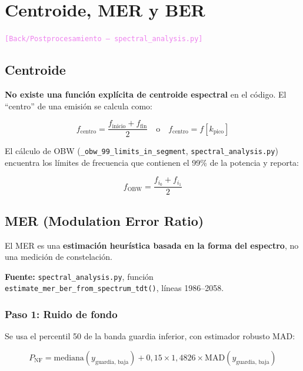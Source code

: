 \documentclass[11pt,a4paper]{article}
\newcommand{\where}[1]{\textcolor{violet}{\texttt{[#1]}}}
\begin{document}
\section{Centroide, MER y BER}
\label{sec:mer_ber}

\where{Back/Postprocesamiento — \texttt{spectral\_analysis.py}}

\subsection{Centroide}

\textbf{No existe una función explícita de centroide espectral} en el código. El ``centro'' de una emisión se calcula como:

\begin{equation}
f_{\text{centro}} = \frac{f_{\text{inicio}} + f_{\text{fin}}}{2} \quad \text{o} \quad f_{\text{centro}} = f[k_{\text{pico}}]
\label{eq:center}
\end{equation}

El cálculo de OBW (\texttt{\_obw\_99\_limits\_in\_segment}, \texttt{spectral\_analysis.py}) encuentra los límites de frecuencia que contienen el 99\% de la potencia y reporta:

\begin{equation}
f_{\text{OBW}} = \frac{f_{i_0} + f_{i_1}}{2}
\label{eq:obw_center}
\end{equation}

\subsection{MER (Modulation Error Ratio)}

El MER es una \textbf{estimación heurística basada en la forma del espectro}, no una medición de constelación.

\textbf{Fuente:} \texttt{spectral\_analysis.py}, función \texttt{estimate\_mer\_ber\_from\_spectrum\_tdt()}, líneas 1986--2058.

\subsubsection{Paso 1: Ruido de fondo}

Se usa el percentil 50 de la banda guardia inferior, con estimador robusto MAD:

\begin{equation}
P_{\text{NF}} = \text{mediana}(y_{\text{guardia, baja}}) + 0{,}15 \times 1{,}4826 \times \text{MAD}(y_{\text{guardia, baja}})
\label{eq:nf}
\end{equation}
\end{document}
